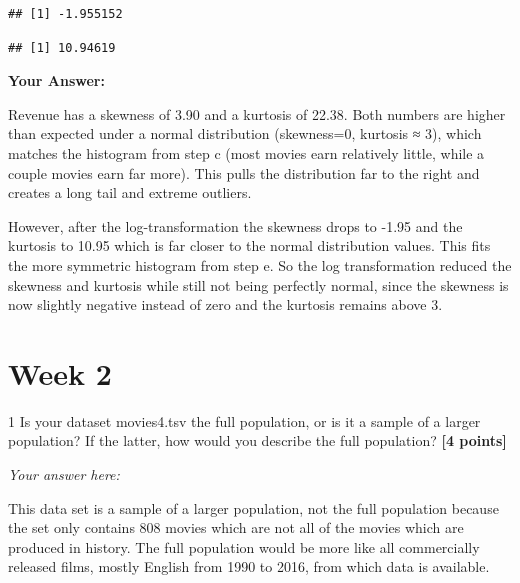 \documentclass[
]{article}
\newenvironment{Shaded}{\begin{snugshade}}{\end{snugshade}}
\newcommand{\AttributeTok}[1]{\textcolor[rgb]{0.13,0.29,0.53}{#1}}
\newcommand{\ConstantTok}[1]{\textcolor[rgb]{0.56,0.35,0.01}{#1}}
\newcommand{\FunctionTok}[1]{\textcolor[rgb]{0.13,0.29,0.53}{\textbf{#1}}}
\newcommand{\NormalTok}[1]{#1}
\newcommand{\SpecialCharTok}[1]{\textcolor[rgb]{0.81,0.36,0.00}{\textbf{#1}}}
\begin{document}
\begin{Shaded}
\end{Shaded}

\begin{verbatim}
## [1] -1.955152
\end{verbatim}

\begin{Shaded}
\end{Shaded}

\begin{verbatim}
## [1] 10.94619
\end{verbatim}

\textbf{Your Answer:}

Revenue has a skewness of 3.90 and a kurtosis of 22.38. Both numbers are
higher than expected under a normal distribution (skewness=0, kurtosis ≈
3), which matches the histogram from step c (most movies earn relatively
little, while a couple movies earn far more). This pulls the
distribution far to the right and creates a long tail and extreme
outliers.

However, after the log-transformation the skewness drops to -1.95 and
the kurtosis to 10.95 which is far closer to the normal distribution
values. This fits the more symmetric histogram from step e. So the log
transformation reduced the skewness and kurtosis while still not being
perfectly normal, since the skewness is now slightly negative instead of
zero and the kurtosis remains above 3.

\section{Week 2}\label{week-2}

1 Is your dataset movies4.tsv the full population, or is it a sample of
a larger population? If the latter, how would you describe the full
population? \textbf{[4 points]}

\emph{Your answer here:}

This data set is a sample of a larger population, not the full
population because the set only contains 808 movies which are not all of
the movies which are produced in history. The full population would be
more like all commercially released films, mostly English from 1990 to
2016, from which data is available.
\end{document}

